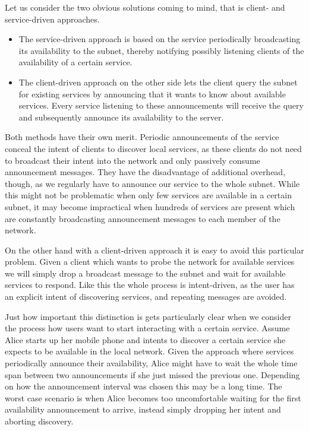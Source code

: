 Let us consider the two obvious solutions coming to mind, that is client- and service-driven approaches.
\begin{itemize}
    \item The service-driven approach is based on the service periodically broadcasting its availability to the subnet, thereby notifying possibly listening clients of the availability of a certain service.
    \item The client-driven approach on the other side lets the client query the subnet for existing services by announcing that it wants to know about available services.
        Every service listening to these announcements will receive the query and subsequently announce its availability to the server.
\end{itemize}

Both methods have their own merit.
Periodic announcements of the service conceal the intent of clients to discover local services, as these clients do not need to broadcast their intent into the network and only passively consume announcement messages.
They have the disadvantage of additional overhead, though, as we regularly have to announce our service to the whole subnet.
While this might not be problematic when only few services are available in a certain subnet, it may become impractical when hundreds of services are present which are constantly broadcasting announcement messages to each member of the network.

On the other hand with a client-driven approach it is easy to avoid this particular problem.
Given a client which wants to probe the network for available services we will simply drop a broadcast message to the subnet and wait for available services to respond.
Like this the whole process is intent-driven, as the user has an explicit intent of discovering services, and repeating messages are avoided.

Just how important this distinction is gets particularly clear when we consider the process how users want to start interacting with a certain service.
Assume Alice starts up her mobile phone and intents to discover a certain service she expects to be available in the local network.
Given the approach where services periodically announce their availability, Alice might have to wait the whole time span between two announcements if she just missed the previous one.
Depending on how the announcement interval was chosen this may be a long time.
The worst case scenario is when Alice becomes too uncomfortable waiting for the first availability announcement to arrive, instead simply dropping her intent and aborting discovery.

